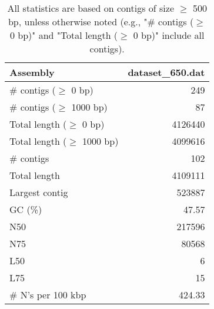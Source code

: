 \documentclass[12pt,a4paper]{article}
\begin{document}
\begin{table}[ht]
\begin{center}
\caption{All statistics are based on contigs of size $\geq$ 500 bp, unless otherwise noted (e.g., "\# contigs ($\geq$ 0 bp)" and "Total length ($\geq$ 0 bp)" include all contigs).}
\begin{tabular}{|l*{1}{|r}|}
\hline
Assembly & dataset\_650.dat \\ \hline
\# contigs ($\geq$ 0 bp) & 249 \\ \hline
\# contigs ($\geq$ 1000 bp) & 87 \\ \hline
Total length ($\geq$ 0 bp) & 4126440 \\ \hline
Total length ($\geq$ 1000 bp) & 4099616 \\ \hline
\# contigs & 102 \\ \hline
Total length & 4109111 \\ \hline
Largest contig & 523887 \\ \hline
GC (\%) & 47.57 \\ \hline
N50 & 217596 \\ \hline
N75 & 80568 \\ \hline
L50 & 6 \\ \hline
L75 & 15 \\ \hline
\# N's per 100 kbp & 424.33 \\ \hline
\end{tabular}
\end{center}
\end{table}
\end{document}
